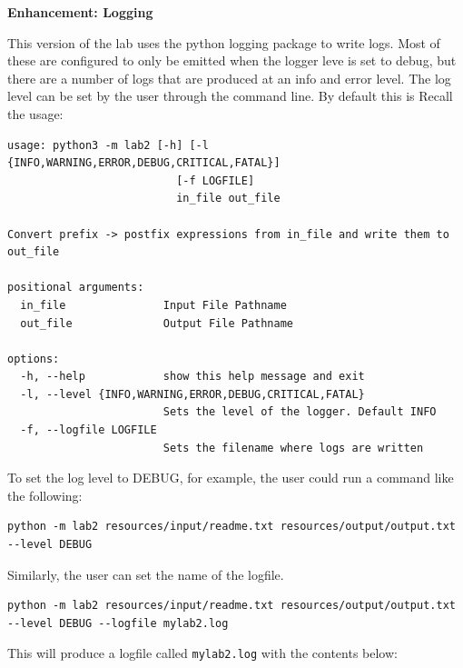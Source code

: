 \documentclass[10pt,letterpaper,final]{report}
\begin{document}
\medskip
\noindent \textbf{Enhancement: Logging}
\medskip

This version of the lab uses the python logging package to write logs. Most of these are configured to only be emitted when the logger leve is set to debug, but there are a number of logs that are produced at an info and error level. The log level can be set by the user through the command line. By default this is Recall the usage:

\begin{verbatim}
usage: python3 -m lab2 [-h] [-l {INFO,WARNING,ERROR,DEBUG,CRITICAL,FATAL}]
                          [-f LOGFILE]
                          in_file out_file

Convert prefix -> postfix expressions from in_file and write them to out_file

positional arguments:
  in_file               Input File Pathname
  out_file              Output File Pathname

options:
  -h, --help            show this help message and exit
  -l, --level {INFO,WARNING,ERROR,DEBUG,CRITICAL,FATAL}
                        Sets the level of the logger. Default INFO
  -f, --logfile LOGFILE
                        Sets the filename where logs are written
\end{verbatim}

To set the log level to DEBUG, for example, the user could run a command like the following:

\begin{verbatim}
python -m lab2 resources/input/readme.txt resources/output/output.txt --level DEBUG
\end{verbatim}

Similarly, the user can set the name of the logfile.

\begin{verbatim}
python -m lab2 resources/input/readme.txt resources/output/output.txt --level DEBUG --logfile mylab2.log
\end{verbatim}

This will produce a logfile called \texttt{mylab2.log} with the contents below:
\end{document}
